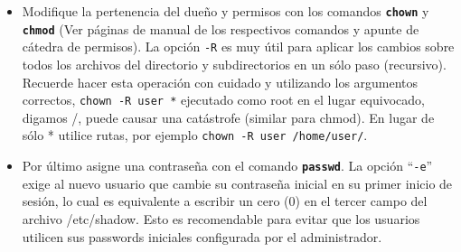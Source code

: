 \documentclass[12pt]{article}
\begin{document}
\begin{itemize}
	\item Modifique la pertenencia del dueño y permisos con los comandos
	\texttt{\textbf{chown}} y \texttt{\textbf{chmod}} (Ver páginas de
	manual de los respectivos comandos y apunte de cátedra de permisos). 
	La opción \texttt{-R} es muy útil para aplicar los cambios sobre todos 
	los archivos del directorio y subdirectorios en un sólo paso (recursivo).
	Recuerde hacer esta operación con cuidado y utilizando los argumentos 
	correctos, \texttt{chown -R user *} ejecutado como root en el lugar equivocado,
	digamos /, puede causar una catástrofe (similar para chmod). En lugar de 
 	sólo * utilice rutas, por ejemplo \texttt{chown -R user /home/user/}. 
 
	\item Por último asigne una contraseña con el comando
	\texttt{\textbf{passwd}}. La opción ``\texttt{-e}'' exige al nuevo usuario 
	que cambie su contraseña inicial en su primer inicio de sesión, lo cual 
	es equivalente a escribir un cero (0) en el tercer campo del archivo 
	/etc/shadow. Esto es recomendable para evitar que los usuarios utilicen 
	sus passwords iniciales configurada por el administrador.  

\end{itemize} 

\end{document}
